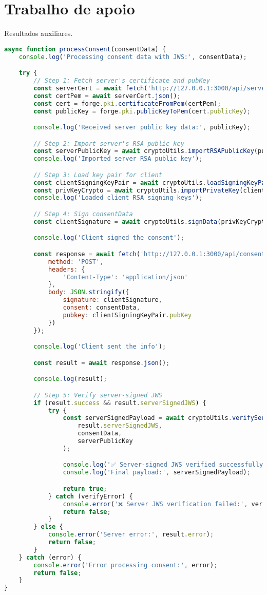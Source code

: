 \chapter{Trabalho de apoio}
Resultados auxiliares.

\begin{lstlisting}[language=Javascript]
async function processConsent(consentData) {
	console.log('Processing consent data with JWS:', consentData);

	try {
		// Step 1: Fetch server's certificate and pubKey
		const serverCert = await fetch('http://127.0.0.1:3000/api/server_certificate');
		const certPem = await serverCert.json();
		const cert = forge.pki.certificateFromPem(certPem);
		const publicKey = forge.pki.publicKeyToPem(cert.publicKey);

		console.log('Received server public key data:', publicKey);

		// Step 2: Import server's RSA public key
		const serverPublicKey = await cryptoUtils.importRSAPublicKey(publicKey);
		console.log('Imported server RSA public key');

		// Step 3: Load key pair for client
		const clientSigningKeyPair = await cryptoUtils.loadSigningKeyPair();
		const privKeyCrypto = await cryptoUtils.importPrivateKey(clientSigningKeyPair.privKey);
		console.log('Loaded client RSA signing keys');

		// Step 4: Sign consentData
		const clientSignature = await cryptoUtils.signData(privKeyCrypto, consentData);

		console.log('Client signed the consent');

		const response = await fetch('http://127.0.0.1:3000/api/consent', {
			method: 'POST',
			headers: {
				'Content-Type': 'application/json'
			},
			body: JSON.stringify({
				signature: clientSignature,
				consent: consentData,
				pubkey: clientSigningKeyPair.pubKey
			})
		});

		console.log('Client sent the info');

		const result = await response.json();

		console.log(result);

		// Step 5: Verify server-signed JWS
		if (result.success && result.serverSignedJWS) {
			try {
				const serverSignedPayload = await cryptoUtils.verifyServerJWS(
					result.serverSignedJWS,
					consentData,
					serverPublicKey
				);

				console.log('✅ Server-signed JWS verified successfully');
				console.log('Final payload:', serverSignedPayload);

				return true;
			} catch (verifyError) {
				console.error('❌ Server JWS verification failed:', verifyError);
				return false;
			}
		} else {
			console.error('Server error:', result.error);
			return false;
		}
	} catch (error) {
		console.error('Error processing consent:', error);
		return false;
	}
}
\end{lstlisting}
\label{apendice:process-consent}

